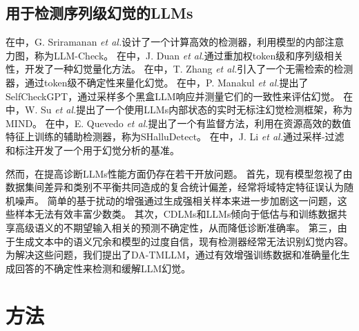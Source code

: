 \documentclass[UTF8,lettersize,journal]{IEEEtran}
\begin{document}
\subsection{用于检测序列级幻觉的LLMs}
在\cite{20251218102787}中，G. Sriramanan \emph{et al.}设计了一个计算高效的检测器，利用模型的内部注意力图，称为LLM-Check。
在\cite{20243917091282}中，J. Duan \emph{et al.}通过重加权token级和序列级相关性，开发了一种幻觉量化方法。
在\cite{20240715556058}中，T. Zhang \emph{et al.}引入了一个无需检索的检测器，通过token级不确定性来量化幻觉。
在\cite{selfcheckgpt}中，P. Manakul \emph{et al.}提出了SelfCheckGPT，通过采样多个黑盒LLM响应并测量它们的一致性来评估幻觉。
在\cite{su-etal-2024-unsupervised}中，W. Su \emph{et al.}提出了一个使用LLMs内部状态的实时无标注幻觉检测框架，称为MIND。
在\cite{10.1007/978-3-031-86623-4_13}中，E. Quevedo \emph{et al.}提出了一个有监督方法，利用在资源高效的数值特征上训练的辅助检测器，称为SHalluDetect。
在\cite{li-etal-2023-halueval}中，J. Li \emph{et al.}通过采样-过滤和标注开发了一个用于幻觉分析的基准。

然而，在提高诊断LLMs性能方面仍存在若干开放问题。
首先，现有模型忽视了由数据集间差异和类别不平衡共同造成的复合统计偏差，经常将域特定特征误认为随机噪声。
简单的基于扰动的增强通过生成强相关样本来进一步加剧这一问题，这些样本无法有效丰富少数类。
其次，CDLMs和LLMs倾向于低估与和训练数据共享高级语义的不期望输入相关的预测不确定性，从而降低诊断准确率。
第三，由于生成文本中的语义冗余和模型的过度自信，现有检测器经常无法识别幻觉内容。
为解决这些问题，我们提出了DA-TMLLM，通过有效增强训练数据和准确量化生成回答的不确定性来检测和缓解LLM幻觉。


\section{方法}
\end{document}

